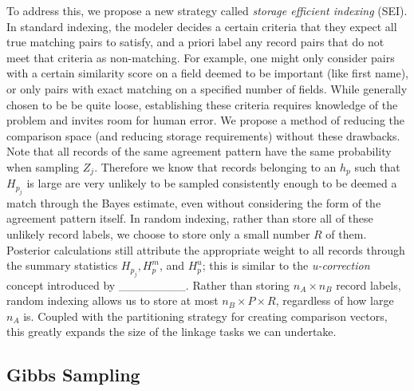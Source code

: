 \documentclass[
  12pt,
]{article}
\begin{document}
To address this, we propose a new strategy called \emph{storage
efficient indexing} (SEI). In standard indexing, the modeler decides a
certain criteria that they expect all true matching pairs to satisfy,
and a priori label any record pairs that do not meet that criteria as
non-matching. For example, one might only consider pairs with a certain
similarity score on a field deemed to be important (like first name), or
only pairs with exact matching on a specified number of fields. While
generally chosen to be be quite loose, establishing these criteria
requires knowledge of the problem and invites room for human error. We
propose a method of reducing the comparison space (and reducing storage
requirements) without these drawbacks. Note that all records of the same
agreement pattern have the same probability when sampling \(Z_j\).
Therefore we know that records belonging to an \(h_p\) such that
\(H_{p_j}\) is large are very unlikely to be sampled consistently enough
to be deemed a match through the Bayes estimate, even without
considering the form of the agreement pattern itself. In random
indexing, rather than store all of these unlikely record labels, we
choose to store only a small number \(R\) of them. Posterior
calculations still attribute the appropriate weight to all records
through the summary statistics \(H_{p_j}, H_p^m\), and \(H_p^u\); this
is similar to the \emph{u-correction} concept introduced by
\_\_\_\_\_\_\_\_. Rather than storing \(n_A \times n_B\) record labels,
random indexing allows us to store at most \(n_B \times P \times R\),
regardless of how large \(n_A\) is. Coupled with the partitioning
strategy for creating comparison vectors, this greatly expands the size
of the linkage tasks we can undertake.

\hypertarget{gibbs-sampling}{%
\subsection{Gibbs Sampling}\label{gibbs-sampling}}
\end{document}
